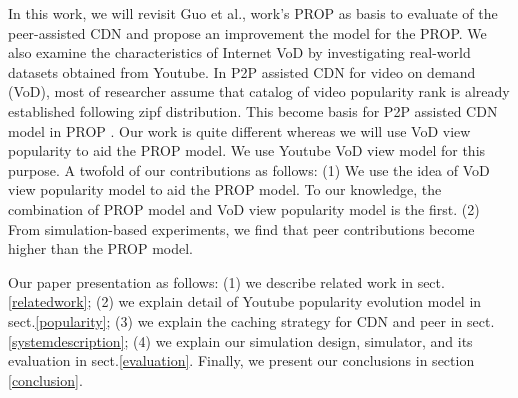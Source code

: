 \documentclass[10pt,final,journal,a4paper]{IEEEtran}
\begin{document}
In this work, we will revisit Guo et al., \cite{1613869} work's PROP as basis to evaluate of the peer-assisted CDN and propose an improvement the model for the PROP.
We also examine the characteristics of Internet VoD by investigating real-world datasets obtained from Youtube.
In P2P assisted CDN for video on demand (VoD), most of researcher assume that catalog of video popularity rank is already established following zipf distribution.  
This become basis for P2P assisted CDN model in PROP \cite{1613869}.
Our work is quite different whereas we will use VoD view popularity to aid the PROP model.
We use Youtube VoD view model for this purpose.
A twofold of our contributions as follows:
(1) We use the idea of VoD view popularity model to aid the PROP model. 
To our knowledge, the combination of PROP model and VoD view popularity model is the first.
(2) From simulation-based experiments, we find that peer contributions become higher than the PROP model.

Our paper presentation as follows: (1) we describe related work in sect.\ref{relatedwork}; (2) we explain detail of Youtube popularity evolution model in sect.\ref{popularity}; (3) we explain the caching strategy for CDN and peer in sect.\ref{systemdescription}; (4) we explain our simulation design, simulator, and its evaluation in sect.\ref{evaluation}.
Finally, we present our conclusions in section \ref{conclusion}.

\end{document}

